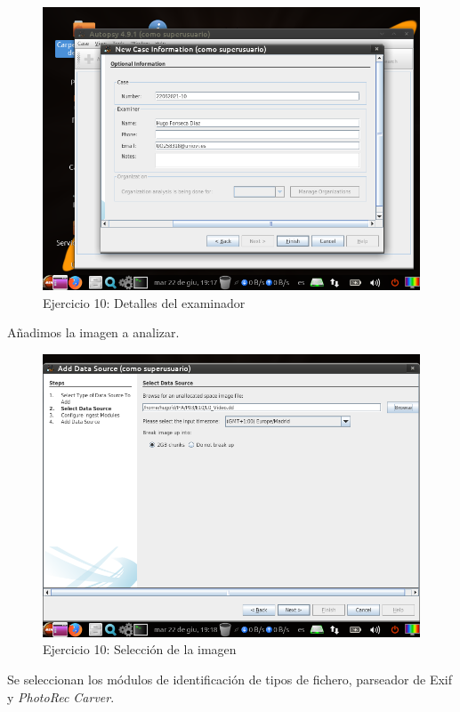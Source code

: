\documentclass[11pt]{article}
\begin{document}
\begin{figure}[H]
    \caption{Ejercicio 10: Detalles del examinador}
    \centering
    \includegraphics[scale=0.7]{e10-2.png}
\end{figure}

Añadimos la imagen a analizar.

\begin{figure}[H]
    \caption{Ejercicio 10: Selección de la imagen}
    \centering
    \includegraphics[scale=0.7]{e10-3.png}
\end{figure}

Se seleccionan los módulos de identificación de tipos de fichero, parseador de Exif y \textit{PhotoRec Carver}.
\end{document}
